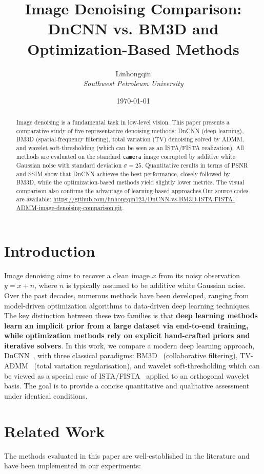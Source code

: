 \documentclass[twocolumn]{article}
\title{\textbf{Image Denoising Comparison: \\ DnCNN vs. BM3D and Optimization-Based Methods}}
\author{ Linhongqin \\ 
\textit{Southwest Petroleum University} \\}
\date{\today}
\begin{document}
\maketitle

\begin{abstract}
Image denoising is a fundamental task in low-level vision. This paper presents a comparative study of five representative denoising methods: DnCNN (deep learning), BM3D (spatial-frequency filtering), total variation (TV) denoising solved by ADMM, and wavelet soft-thresholding (which can be seen as an ISTA/FISTA realization). All methods are evaluated on the standard \texttt{camera} image corrupted by additive white Gaussian noise with standard deviation $\sigma=25$. Quantitative results in terms of PSNR and SSIM show that DnCNN achieves the best performance, closely followed by BM3D, while the optimization-based methods yield slightly lower metrics. The visual comparison also confirms the advantage of learning-based approaches.Our source codes are available: 
    \href{https://github.com/linhongqin123/DnCNN-vs-BM3D-ISTA-FISTA-ADMM-image-denoising-comparison.git}{https://github.com/linhongqin123/DnCNN-vs-BM3D-ISTA-FISTA-ADMM-image-denoising-comparison.git}.
\end{abstract}

\section{Introduction}
Image denoising aims to recover a clean image $x$ from its noisy observation $y = x + n$, where $n$ is typically assumed to be additive white Gaussian noise. Over the past decades, numerous methods have been developed, ranging from model-driven optimization algorithms to data-driven deep learning techniques. The key distinction between these two families is that \textbf{deep learning methods learn an implicit prior from a large dataset via end-to-end training, while optimization methods rely on explicit hand-crafted priors and iterative solvers}. In this work, we compare a modern deep learning approach, DnCNN~\cite{zhang2017beyond}, with three classical paradigms: BM3D~\cite{dabov2007image} (collaborative filtering), TV-ADMM~\cite{rudin1992nonlinear} (total variation regularisation), and wavelet soft-thresholding which can be viewed as a special case of ISTA/FISTA~\cite{beck2009fast} applied to an orthogonal wavelet basis. The goal is to provide a concise quantitative and qualitative assessment under identical conditions.

\section{Related Work}
The methods evaluated in this paper are well-established in the literature and have been implemented in our experiments:
\end{document}

